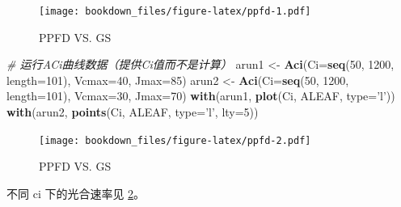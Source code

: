 \documentclass[]{krantz}
\makeatletter
\newenvironment{Shaded}{\begin{snugshade}}{\end{snugshade}}
\newcommand{\KeywordTok}[1]{\textcolor[rgb]{0.13,0.29,0.53}{\textbf{#1}}}
\newcommand{\DataTypeTok}[1]{\textcolor[rgb]{0.13,0.29,0.53}{#1}}
\newcommand{\DecValTok}[1]{\textcolor[rgb]{0.00,0.00,0.81}{#1}}
\newcommand{\StringTok}[1]{\textcolor[rgb]{0.31,0.60,0.02}{#1}}
\newcommand{\CommentTok}[1]{\textcolor[rgb]{0.56,0.35,0.01}{\textit{#1}}}
\newcommand{\NormalTok}[1]{#1}
\newenvironment{kframe}{%
\medskip{}
\setlength{\fboxsep}{.8em}
 \def\at@end@of@kframe{}%
 \ifinner\ifhmode%
  \def\at@end@of@kframe{\end{minipage}}%
  \begin{minipage}{\columnwidth}%
 \fi\fi%
 \def\FrameCommand##1{\hskip\@totalleftmargin \hskip-\fboxsep
 \colorbox{shadecolor}{##1}\hskip-\fboxsep
     \hskip-\linewidth \hskip-\@totalleftmargin \hskip\columnwidth}%
 \MakeFramed {\advance\hsize-\width
   \@totalleftmargin\z@ \linewidth\hsize
   \@setminipage}}%
 {\par\unskip\endMakeFramed%
 \at@end@of@kframe}
\renewenvironment{Shaded}{\begin{kframe}}{\end{kframe}}
\theoremstyle{definition}
\theoremstyle{definition}
\theoremstyle{definition}
\theoremstyle{remark}
\makeatother
\begin{document}
\begin{figure}
\centering
\texttt{[image: bookdown\_files/figure-latex/ppfd-1.pdf]}
\caption{\label{fig:ppfd}PPFD VS. GS}
\end{figure}

\begin{Shaded}
\begin{Highlighting}[]
\CommentTok{# 运行ACi曲线数据（提供Ci值而不是计算）}
\NormalTok{arun1 <-}\StringTok{ }\KeywordTok{Aci}\NormalTok{(}\DataTypeTok{Ci=}\KeywordTok{seq}\NormalTok{(}\DecValTok{50}\NormalTok{, }\DecValTok{1200}\NormalTok{, }\DataTypeTok{length=}\DecValTok{101}\NormalTok{), }
             \DataTypeTok{Vcmax=}\DecValTok{40}\NormalTok{, }\DataTypeTok{Jmax=}\DecValTok{85}\NormalTok{)}
\NormalTok{arun2 <-}\StringTok{ }\KeywordTok{Aci}\NormalTok{(}\DataTypeTok{Ci=}\KeywordTok{seq}\NormalTok{(}\DecValTok{50}\NormalTok{, }\DecValTok{1200}\NormalTok{, }\DataTypeTok{length=}\DecValTok{101}\NormalTok{), }
             \DataTypeTok{Vcmax=}\DecValTok{30}\NormalTok{, }\DataTypeTok{Jmax=}\DecValTok{70}\NormalTok{)}
\KeywordTok{with}\NormalTok{(arun1, }\KeywordTok{plot}\NormalTok{(Ci, ALEAF, }\DataTypeTok{type=}\StringTok{'l'}\NormalTok{))}
\KeywordTok{with}\NormalTok{(arun2, }\KeywordTok{points}\NormalTok{(Ci, ALEAF, }\DataTypeTok{type=}\StringTok{'l'}\NormalTok{, }\DataTypeTok{lty=}\DecValTok{5}\NormalTok{))}
\end{Highlighting}
\end{Shaded}

\begin{figure}
\centering
\texttt{[image: bookdown\_files/figure-latex/ppfd-2.pdf]}
\caption{\label{fig:ppfd}PPFD VS. GS}
\end{figure}

不同 ci 下的光合速率见 \ref{fig:ppfd}。
\end{document}
